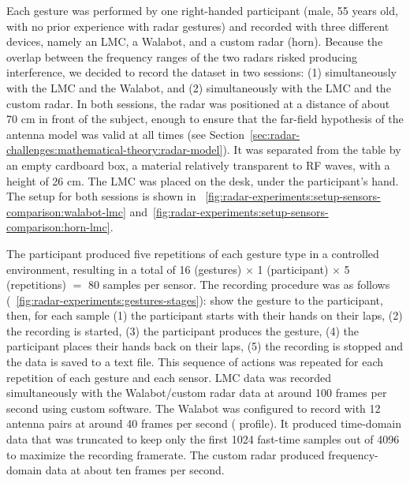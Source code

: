 Each gesture was performed by one right-handed participant (male, 55 years old, with no prior experience with radar gestures) and recorded with three different devices, namely an LMC, a Walabot, and a custom radar (horn). Because the overlap between the frequency ranges of the two radars risked producing interference, we decided to record the dataset in two sessions: (1) simultaneously with the LMC and the Walabot, and (2) simultaneously with the LMC and the custom radar. 
In both sessions, the radar was positioned at a distance of about 70 cm in front of the subject, enough to ensure that the far-field hypothesis of the antenna model was valid at all times (see Section~\ref{sec:radar-challenges:mathematical-theory:radar-model}). It was separated from the table by an empty cardboard box, a material relatively transparent to RF waves, with a height of 26 cm. The LMC was placed on the desk, under the participant's hand. The setup for both sessions is shown in \fig~\ref{fig:radar-experiments:setup-sensors-comparison:walabot-lmc} and~\ref{fig:radar-experiments:setup-sensors-comparison:horn-lmc}.

The participant produced five repetitions of each gesture type in a controlled environment, resulting in a total of 16 (gestures) $\times$ 1 (participant) $\times$ 5 (repetitions) $=$ 80 samples per sensor. 
The recording procedure was as follows (\fig~\ref{fig:radar-experiments:gestures-stages}): show the gesture to the participant, then, for each sample (1) the participant starts with their hands on their laps, (2) the recording is started, (3) the participant produces the gesture, (4) the participant places their hands back on their laps, (5) the recording is stopped and the data is saved to a text file. This sequence of actions was repeated for each repetition of each gesture and each sensor. LMC data was recorded simultaneously with the Walabot/custom radar data at around 100 frames per second using custom software.
The Walabot was configured to record with 12 antenna pairs at around 40 frames per second ( profile). It produced time-domain data that was truncated to keep only the first 1024 fast-time samples out of 4096 to maximize the recording framerate.
The custom radar produced frequency-domain data at about ten frames per second.

